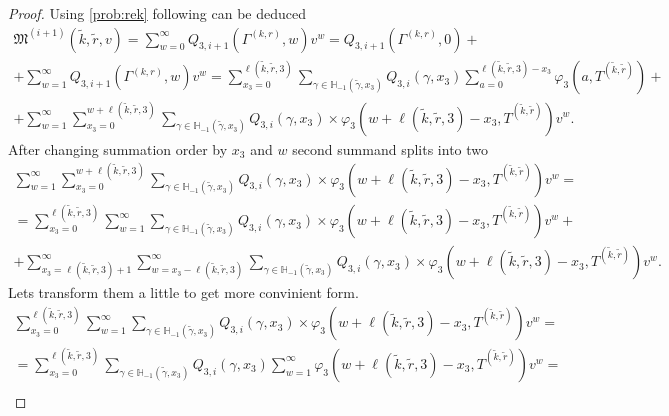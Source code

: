 \documentclass[runningheads,a4paper]{llncs}
\begin{document}
\begin{proof}
Using \eqref{prob:rek} following can be deduced
\begin{multline}
\mathfrak{M}^{(i+1)}(\tilde{k},\tilde{r},v) =\sum_{w=0}^{\infty} Q_{3,i+1}(\Gamma^{(k,r)},w) v^w = Q_{3,i+1}(\Gamma^{(k,r)},0) +\\
+\sum_{w=1}^{\infty} Q_{3,i+1}(\Gamma^{(k,r)},w) v^w 
=\sum_{x_3=0}^{\ell(\tilde{k},\tilde{r},3)}\sum_{\gamma \in {\mathbb H}_{-1}(\tilde{\gamma},x_3)} Q_{3,i}(\gamma,x_3) \sum_{a=0}^{\ell(\tilde{k},\tilde{r},3) - x_3} \varphi_3(a,T^{(\tilde{k},\tilde{r})}) + \\
+ \sum_{w=1}^{\infty} \sum_{x_3=0}^{w +  \ell(\tilde{k},\tilde{r},3)}\sum_{\gamma \in {\mathbb H}_{-1}(\tilde{\gamma},x_3)} Q_{3,i}(\gamma,x_3) \times 
\varphi_3(w + \ell(\tilde{k},\tilde{r},3) - x_3,T^{(\tilde{k},\tilde{r})}) v^w.
\label{sum:zero}
\end{multline}
After changing summation order by $x_3$ and $w$ second summand splits into two
\begin{multline}
\sum_{w=1}^{\infty} \sum_{x_3=0}^{w +  \ell(\tilde{k},\tilde{r},3)}\sum_{\gamma \in {\mathbb H}_{-1}(\tilde{\gamma},x_3)} Q_{3,i}(\gamma,x_3) \times 
\varphi_3(w + \ell(\tilde{k},\tilde{r},3) - x_3,T^{(\tilde{k},\tilde{r})}) v^w = \\
= \sum_{x_3=0}^{\ell(\tilde{k},\tilde{r},3)}\sum_{w=1}^{\infty}\sum_{\gamma \in {\mathbb H}_{-1}(\tilde{\gamma},x_3)} Q_{3,i}(\gamma,x_3) \times 
\varphi_3(w + \ell(\tilde{k},\tilde{r},3) - x_3,T^{(\tilde{k},\tilde{r})}) v^w + \\
+\sum_{x_3=\ell(\tilde{k},\tilde{r},3) + 1}^{\infty}\sum_{w=x_3-\ell(\tilde{k},\tilde{r},3)}^{\infty}\sum_{\gamma \in {\mathbb H}_{-1}(\tilde{\gamma},x_3)} Q_{3,i}(\gamma,x_3) \times 
\varphi_3(w + \ell(\tilde{k},\tilde{r},3) - x_3,T^{(\tilde{k},\tilde{r})}) v^w.
\label{double:sum}
\end{multline}
Lets transform them a little to get more convinient form.
\begin{multline}
 \sum_{x_3=0}^{\ell(\tilde{k},\tilde{r},3)}\sum_{w=1}^{\infty}  \sum_{\gamma \in {\mathbb H}_{-1}(\tilde{\gamma},x_3)} Q_{3,i}(\gamma,x_3) \times 
\varphi_3(w + \ell(\tilde{k},\tilde{r},3) - x_3,T^{(\tilde{k},\tilde{r})}) v^w = \\
=  \sum_{x_3=0}^{\ell(\tilde{k},\tilde{r},3)}  \sum_{\gamma \in {\mathbb H}_{-1}(\tilde{\gamma},x_3)} Q_{3,i}(\gamma,x_3)  \sum_{w=1}^{\infty} 
\varphi_3(w + \ell(\tilde{k},\tilde{r},3) - x_3,T^{(\tilde{k},\tilde{r})}) v^w = \\

\end{multline}
\end{proof}
\end{document}
